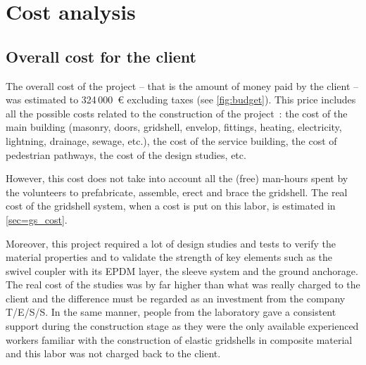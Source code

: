 \section{Cost analysis}\label{sec=costanalysis}
\subsection{Overall cost for the client}
The overall cost of the project -- that is the amount of money paid by the client -- was estimated to 324\,000~€ excluding taxes (see \cref{fig:budget}). This price includes all the possible costs related to the construction of the project~: the cost of the main building (masonry, doors, gridshell, envelop, fittings, heating, electricity, lightning, drainage, sewage, etc.), the cost of the service building, the cost of pedestrian pathways, the cost of the design studies, etc.

However, this cost does not take into account all the (free) man-hours spent by the volunteers to prefabricate, assemble, erect and brace the gridshell. The real cost of the gridshell system, when a cost is put on this labor, is estimated in \cref{sec=gs_cost}.



Moreover, this project required a lot of design studies and tests to verify the material properties and to validate the strength of key elements such as the swivel coupler with its EPDM layer, the sleeve system and the ground anchorage. The real cost of the studies was by far higher than what was really charged to the client and the difference must be regarded as an investment from the company T/E/S/S. In the same manner, people from the laboratory gave a consistent support during the construction stage as they were the only available experienced workers familiar with the construction of elastic gridshells in composite material \cite{Douthe2010a,Baverel2012} and this labor was not charged back to the client.

